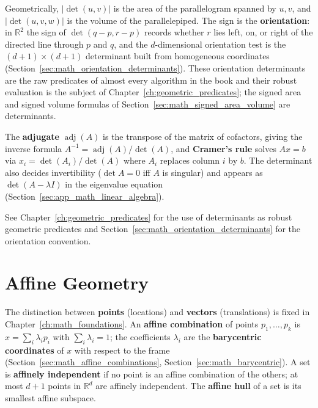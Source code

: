 Geometrically, $|\det(u,v)|$ is the area of the parallelogram spanned by
$u,v$, and $|\det(u,v,w)|$ is the volume of the parallelepiped. The sign is
the \textbf{orientation}: in $\mathbb{R}^2$ the sign of
$\det(q-p, r-p)$ records whether $r$ lies left, on, or right of the directed
line through $p$ and $q$, and the $d$-dimensional orientation test is the
$(d+1) \times (d+1)$ determinant built from homogeneous coordinates
(Section~\ref{sec:math_orientation_determinants}). These orientation
determinants are the raw predicates of almost every algorithm in the book and
their robust evaluation is the subject of
Chapter~\ref{ch:geometric_predicates}; the signed area and signed volume
formulas of Section~\ref{sec:math_signed_area_volume} are determinants.

The \textbf{adjugate} $\operatorname{adj}(A)$ is the transpose of the matrix
of cofactors, giving the inverse formula $A^{-1} = \operatorname{adj}(A)/\det(A)$,
and \textbf{Cramer's rule} solves $Ax = b$ via
$x_i = \det(A_i)/\det(A)$ where $A_i$ replaces column $i$ by $b$.
The determinant also decides invertibility ($\det A = 0$ iff $A$ is singular)
and appears as $\det(A - \lambda I)$ in the eigenvalue equation
(Section~\ref{sec:app_math_linear_algebra}).

See Chapter~\ref{ch:geometric_predicates} for the use of determinants as
robust geometric predicates and Section~\ref{sec:math_orientation_determinants}
for the orientation convention.

\section{Affine Geometry}
\label{sec:app_math_affine}

The distinction between \textbf{points} (locations) and \textbf{vectors}
(translations) is fixed in Chapter~\ref{ch:math_foundations}. An
\textbf{affine combination} of points $p_1,\dots,p_k$ is
$x = \sum_i \lambda_i p_i$ with $\sum_i \lambda_i = 1$; the coefficients
$\lambda_i$ are the \textbf{barycentric coordinates} of $x$ with respect to
the frame (Section~\ref{sec:math_affine_combinations},
Section~\ref{sec:math_barycentric}). A set is \textbf{affinely independent}
if no point is an affine combination of the others; at most $d+1$ points in
$\mathbb{R}^d$ are affinely independent. The \textbf{affine hull} of a set is
its smallest affine subspace.

